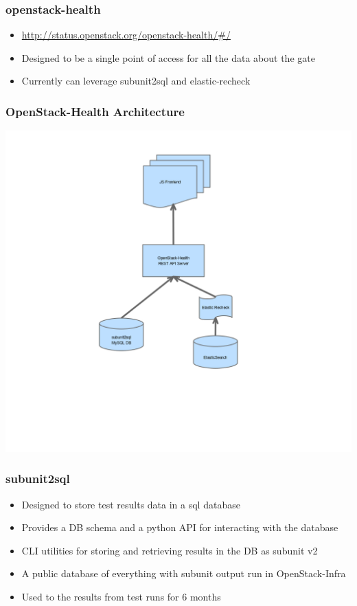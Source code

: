 \documentclass[aspectratio=43,11pt,hyperref={colorlinks=true}]{beamer}
\begin{document}
\begin{frame}
    \frametitle{openstack-health}
    \begin{itemize}
        \item \href{http://status.openstack.org/openstack-health/\#/}{http://status.openstack.org/openstack-health/\#/}
        \item Designed to be a single point of access for all the data about the gate
        \item Currently can leverage subunit2sql and elastic-recheck
    \end{itemize}
\end{frame}

\begin{frame}
    \frametitle{OpenStack-Health Architecture}
    \begin{center}
        \includegraphics[height=1.1\textheight]{openstack-health-arch.png}
    \end{center}
\end{frame}

\begin{frame}
    \frametitle{subunit2sql}
    \begin{itemize}
        \item Designed to store test results data in a sql database
        \item Provides a DB schema and a python API for interacting with the
              database
        \item CLI utilities for storing and retrieving results in the DB as subunit v2
        \item A public database of everything with subunit output run in OpenStack-Infra
        \item Used to the results from test runs for 6 months
    \end{itemize}

\end{frame}
\end{document}

